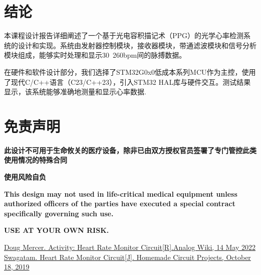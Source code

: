 \documentclass[a4paper]{ctexart}
\begin{document}
\newpage
\section{结论}
	
	本课程设计报告详细阐述了一个基于光电容积描记术（PPG）的光学心率检测系统的设计和实现。系统由发射器控制模块，接收器模块，带通滤波模块和信号分析模块组成，能够实时处理和显示30~260bpm间的脉搏数据。
	
	在硬件和软件设计部分，我们选择了STM32G0x0低成本系列MCU作为主控，使用了现代C/C++语言（C23/C++23），引入STM32 HAL库与硬件交互。测试结果显示，该系统能够准确地测量和显示心率数据.

\section{免责声明}
	\textbf{此设计不可用于生命攸关的医疗设备，除非已由双方授权官员签署了专门管控此类使用情况的特殊合同}
	
	\textbf{使用风险自负}
	
	\textbf{This design may not used in life-critical medical equipment unless authorized officers of the parties have executed a special contract specifically governing such use.}
	
	\textbf{USE AT YOUR OWN RISK.}

\newpage
\begin{thebibliography}{20}
	\href{https://wiki.analog.com/university/courses/alm1k/alm-lab-heart-rate-mon}{Doug Mercer. Activity: Heart Rate Monitor Circuit[R].Analog Wiki, 14 May 2022}
	\href{https://www.homemade-circuits.com/heart-rate-monitor-alarm-circuit/}{Swagatam. Heart Rate Monitor Circuit[J]. Homemade Circuit Projects, October 18, 2019}
\end{thebibliography}
\end{document}
